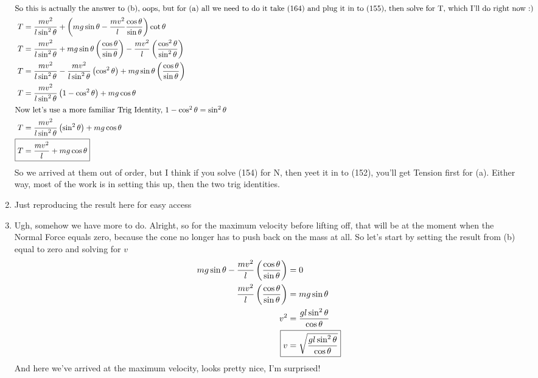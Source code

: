 \documentclass{article}
\newcommand{\sinth}{\sin{\theta}}
\newcommand{\costh}{\cos{\theta}}
\begin{document}
\begin{enumerate}[label=\alph*)]
\begin{align}
	\intertext{So this is actually the answer to (b), oops, but for (a) all we need to do it take (164) and plug it in to (155), then solve for T, which I'll do right now :) }
	T &= \frac{mv^2}{l\sin^2{\theta}} + \left( mg\sinth - \frac{mv^2}{l}\frac{\costh}{\sinth} \right) \cot{\theta} \\
	T &= \frac{mv^2}{l\sin^2{\theta}} + mg\sinth \left( \frac{\costh}{\sinth} \right) - \frac{mv^2}{l} \left( \frac{\cos^2{\theta}}{\sin^2{\theta}} \right) \\
	T &= \frac{mv^2}{l\sin^2{\theta}} - \frac{mv^2}{l\sin^2{\theta}} \left( \cos^2{\theta}\right) + mg\sinth \left( \frac{\costh}{\sinth} \right) \\ 
	T &= \frac{mv^2}{l\sin^2{\theta}} \left(1 - \cos^2{\theta} \right) + mg\costh  \\ 
	\intertext{Now let's use a more familiar Trig Identity, $1 - \cos^2{\theta} = \sin^2{\theta}$}
	T &= \frac{mv^2}{l\sin^2{\theta}} \left(\sin^2{\theta} \right) + mg\costh \\
	\Aboxed{T &= \frac{mv^2}{l} + mg\costh}
	\end{align}
So we arrived at them out of order, but I think if you solve (154) for N, then yeet it in to (152), you'll get Tension first for (a). Either way, most of the work is in setting this up, then the two trig identities. 
	\item %
	Just reproducing the result here for easy access
	\boxed{ N = mg\sinth - \frac{mv^2}{l}\left( \frac{\costh}{\sinth} \right)} 
	\item %
	Ugh, somehow we have more to do. Alright, so for the maximum velocity before lifting off, that will be at the moment when the Normal Force equals zero, because the cone no longer has to push back on the mass at all. So let's start by setting the result from (b) equal to zero and solving for $v$
	\begin{align}
		mg\sinth - \frac{mv^2}{l}\left( \frac{\costh}{\sinth} \right) &= 0 \\
		\frac{mv^2}{l}\left( \frac{\costh}{\sinth} \right) &= mg\sinth \\ 
		v^2 &= \frac{gl\sin^2{\theta}}{\costh} \\
		\Aboxed{v &= \sqrt{ \frac{gl\sin^2{\theta}}{\costh} } }
	\end{align}
And here we've arrived at the maximum velocity, looks pretty nice, I'm surprised!
\end{enumerate}
\end{document}
